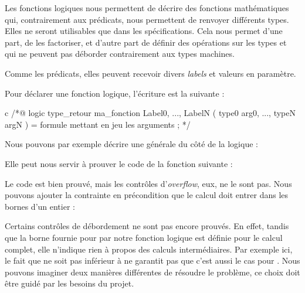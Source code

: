 Les fonctions logiques nous permettent de décrire des fonctions mathématiques
qui, contrairement aux prédicats, nous permettent de renvoyer différents types.
Elles ne seront utilisables que dans les spécifications. Cela nous permet d'une
part, de les factoriser, et d'autre part de définir des opérations sur les
types  et  qui ne peuvent pas déborder
contrairement aux types machines.



Comme les prédicats, elles peuvent recevoir divers \textit{labels} et valeurs en
paramètre.





Pour déclarer une fonction logique, l'écriture est la suivante :



\begin{CodeBlock}{c}
/*@
  logic type_retour ma_fonction{ Label0, ..., LabelN }( type0 arg0, ..., typeN argN ) =
    formule mettant en jeu les arguments ;
*/
\end{CodeBlock}



Nous pouvons par exemple décrire une  générale du côté de la logique :






Elle peut nous servir à prouver le code de la fonction suivante :








Le code est bien prouvé, mais les contrôles d'\textit{overflow}, eux, ne le sont pas.
Nous pouvons ajouter la contrainte en précondition que le calcul doit entrer dans
les bornes d'un entier :




Certains contrôles de débordement ne sont pas encore prouvés. En effet, tandis que
la borne fournie pour  par notre fonction logique est définie pour
le calcul complet, elle n'indique rien à propos des calculs intermédiaires. Par
exemple ici, le fait que  ne soit pas inférieur à
 ne garantit pas que c'est aussi le cas pour
. Nous pouvons imaginer deux manières différentes de résoudre
le problème, ce choix doit être guidé par les besoins du projet.


